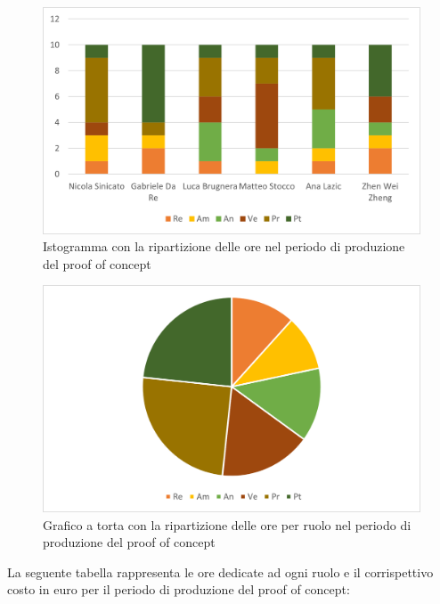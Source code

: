 \begin{figure}[H]
    \centering
    \includegraphics[scale=0.6]{img/grafi preventivo/istogrammi/proof/complessivo.png}
    \caption{Istogramma con la ripartizione delle ore nel periodo di produzione del proof of concept}
\end{figure}
\begin{figure}[H]
    \centering
    \includegraphics[scale=0.6]{img/grafi preventivo/torta/proof/complessivo.png}
    \caption{Grafico a torta con la ripartizione delle ore per ruolo nel periodo di produzione del proof of concept}
\end{figure}
La seguente tabella rappresenta le ore dedicate ad ogni ruolo e il corrispettivo costo in euro per il periodo di produzione del proof of concept:

